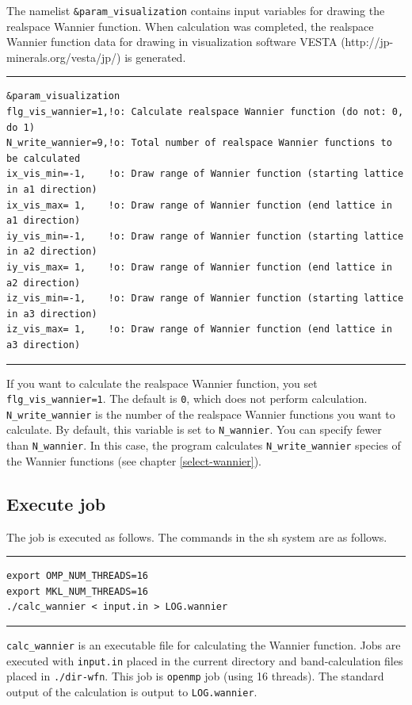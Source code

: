 \documentclass{article}
\begin{document}
The namelist \verb+&param_visualization+ contains input variables for drawing the realspace Wannier function. When calculation was completed, the realspace Wannier function data for drawing in visualization software {\sc VESTA} (http://jp-minerals.org/vesta/jp/) is generated.
\vspace{5mm}\hrule
\begin{verbatim}
&param_visualization   
flg_vis_wannier=1,!o: Calculate realspace Wannier function (do not: 0, do 1)
N_write_wannier=9,!o: Total number of realspace Wannier functions to be calculated
ix_vis_min=-1,    !o: Draw range of Wannier function (starting lattice in a1 direction)
ix_vis_max= 1,    !o: Draw range of Wannier function (end lattice in a1 direction)
iy_vis_min=-1,    !o: Draw range of Wannier function (starting lattice in a2 direction)
iy_vis_max= 1,    !o: Draw range of Wannier function (end lattice in a2 direction)
iz_vis_min=-1,    !o: Draw range of Wannier function (starting lattice in a3 direction)
iz_vis_max= 1,    !o: Draw range of Wannier function (end lattice in a3 direction)
\end{verbatim}
\hrule\vspace{5mm}
If you want to calculate the realspace Wannier function, you set \verb+flg_vis_wannier=1+. The default is \verb+0+, which does not perform calculation. \verb+N_write_wannier+ is the number of the realspace Wannier functions you want to calculate. By default, this variable is set to \verb+N_wannier+. You can specify fewer than \verb+N_wannier+. In this case, the program calculates \verb+N_write_wannier+ species of the Wannier functions (see chapter \ref{select-wannier}).

\subsection{\label{job-wannier}Execute job}
The job is executed as follows. The commands in the sh system are as follows.
\vspace{3mm}\hrule
\begin{verbatim}
export OMP_NUM_THREADS=16
export MKL_NUM_THREADS=16
./calc_wannier < input.in > LOG.wannier  
\end{verbatim}
\hrule\vspace{3mm}
\verb+calc_wannier+ is an executable file for calculating the Wannier function. Jobs are executed with \verb+input.in+ placed in the current directory and band-calculation files placed in \verb+./dir-wfn+. This job is \verb+openmp+ job (using 16 threads). The standard output of the calculation is output to \verb+LOG.wannier+.
\vspace{-3mm}
\end{document}
